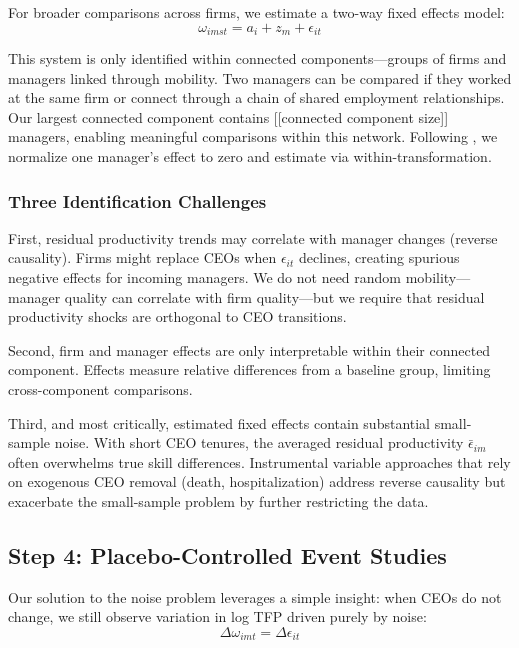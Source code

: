 \documentclass[11pt,a4paper]{article}
\begin{document}
For broader comparisons across firms, we estimate a two-way fixed effects model:
\begin{equation}
\omega_{imst} = a_i + z_m + \epsilon_{it}
\end{equation}

This system is only identified within connected components—groups of firms and managers linked through mobility. Two managers can be compared if they worked at the same firm or connect through a chain of shared employment relationships. Our largest connected component contains [[connected component size]] managers, enabling meaningful comparisons within this network. Following \citet{Abowd1999Econometrica}, we normalize one manager's effect to zero and estimate via within-transformation.

\subsubsection{Three Identification Challenges}

First, residual productivity trends may correlate with manager changes (reverse causality). Firms might replace CEOs when $\epsilon_{it}$ declines, creating spurious negative effects for incoming managers. We do not need random mobility—manager quality can correlate with firm quality—but we require that residual productivity shocks are orthogonal to CEO transitions.

Second, firm and manager effects are only interpretable within their connected component. Effects measure relative differences from a baseline group, limiting cross-component comparisons.

Third, and most critically, estimated fixed effects contain substantial small-sample noise. With short CEO tenures, the averaged residual productivity $\bar{\epsilon}_{im}$ often overwhelms true skill differences. Instrumental variable approaches that rely on exogenous CEO removal (death, hospitalization) address reverse causality but exacerbate the small-sample problem by further restricting the data.

\subsection{Step 4: Placebo-Controlled Event Studies}

Our solution to the noise problem leverages a simple insight: when CEOs do not change, we still observe variation in log TFP driven purely by noise:
\begin{equation}
\Delta\omega_{imt} = \Delta\epsilon_{it}
\end{equation}
\end{document}
